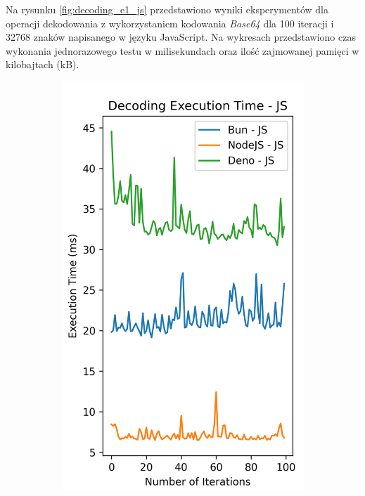 Na rysunku \ref{fig:decoding_e1_js} przedstawiono wyniki eksperymentów dla operacji dekodowania z wykorzystaniem kodowania \textit{Base64} dla 100 iteracji i 32768 znaków napisanego w języku JavaScript. Na wykresach przedstawiono czas wykonania jednorazowego testu w milisekundach oraz ilość zajmowanej pamięci w kilobajtach (kB).

\begin{figure}[H]
  \centering
  \begin{subfigure}[b]{0.44\textwidth}
    \centering
    \includegraphics[width=\textwidth]{Figures/coding/base64_100_decoding_js_time.png}

\end{subfigure}
\end{figure}
